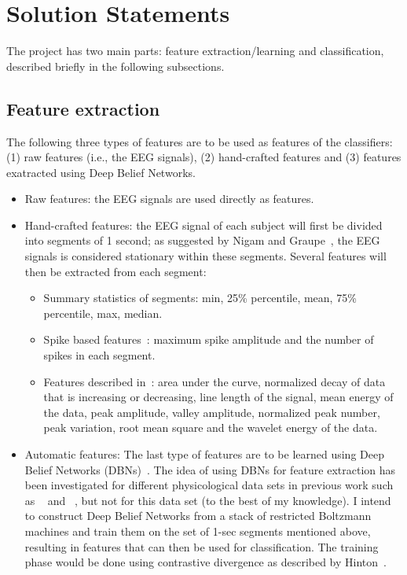 \documentclass[12pt]{article}
\begin{document}
\section{Solution Statements}

The project has two main parts: feature extraction/learning and classification, described briefly in the following subsections.

\subsection{Feature extraction}
The following three types of features are to be used as features of the classifiers: (1) raw features (i.e., the EEG signals), (2) hand-crafted features and (3) features exatracted using Deep Belief Networks.

\begin{itemize}

\item Raw features: the EEG signals are used directly as features.

\item Hand-crafted features: the EEG signal of each subject will first be divided into segments of 1 second; as suggested by Nigam and Graupe~\cite{nigam2004neural}, the EEG signals is considered stationary within these segments. Several features will then be extracted from each segment:
      \begin{itemize}
      \item Summary statistics of segments: min, 25\% percentile, mean, 75\% percentile, max, median.
      \item Spike based features~\cite{nigam2004neural}: maximum spike amplitude and the number of spikes in each segment.
      \item Features described in~\cite{wulsin2011modeling}: area under the curve, normalized decay of data that is increasing or decreasing, line length of the signal, mean energy of the data, peak amplitude, valley amplitude, normalized peak number, peak variation, root mean square and the wavelet energy of the data.
      \end{itemize}

\item Automatic features: The last type of features are to be learned using Deep Belief Networks (DBNs)~\cite{hinton2006reducing}. The idea of using DBNs for feature extraction has been investigated for different physicological data sets in previous work such as ~\cite{langkvist2012sleep} and ~\cite{wulsin2011modeling}, but not for this data set (to the best of my knowledge). I intend to construct Deep Belief Networks from a stack of restricted Boltzmann machines and train them on the set of 1-sec segments mentioned above, resulting in features that can then be used for classification. The training phase would be done using contrastive divergence as described by Hinton~\cite{hinton2006training}.

\end{itemize}
\end{document}
